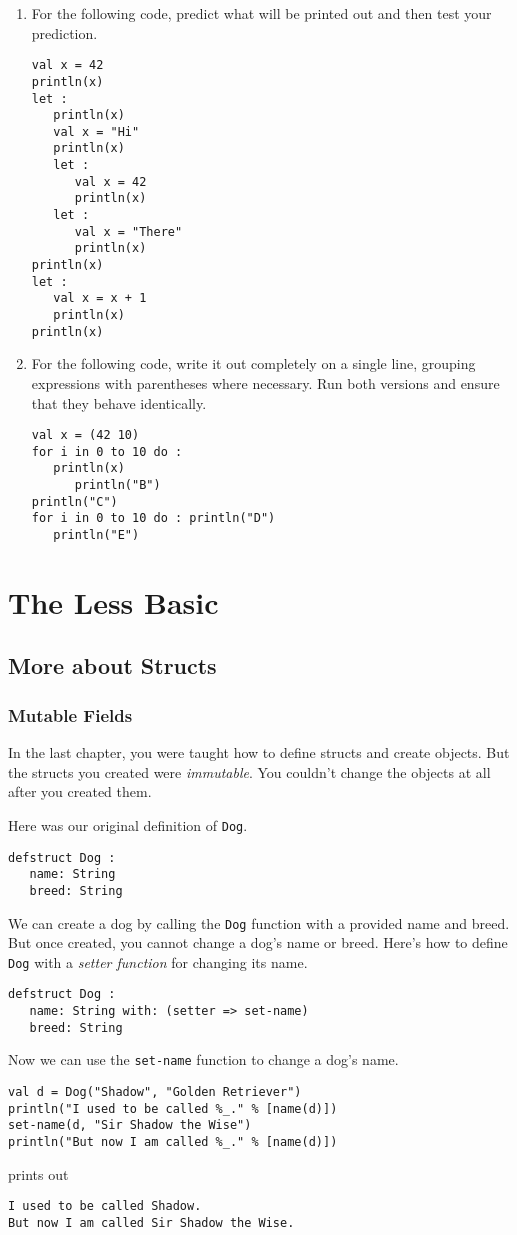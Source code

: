 \documentclass[10pt,oneside]{book}
\begin{document}
\begin{enumerate}
\item For the following code, predict what will be printed out and then test your prediction.
\begin{lstlisting}
val x = 42
println(x)
let :
   println(x)
   val x = "Hi"
   println(x)
   let :
      val x = 42
      println(x)
   let :
      val x = "There"
      println(x)
println(x)
let :
   val x = x + 1
   println(x)
println(x)
\end{lstlisting}

\item For the following code, write it out completely on a single line, grouping expressions with parentheses where necessary. Run both versions and ensure that they behave identically.
\begin{lstlisting}
val x = (42 10)
for i in 0 to 10 do :
   println(x)
      println("B")
println("C")
for i in 0 to 10 do : println("D")
   println("E")
\end{lstlisting}
\end{enumerate}

\chapter{The Less Basic}

\section{More about Structs}
\subsection*{Mutable Fields}
In the last chapter, you were taught how to define structs and create objects. But the structs you created were {\em immutable}. You couldn't change the objects at all after you created them. 

Here was our original definition of \texttt{\frenchspacing Dog}. 
\begin{lstlisting}
defstruct Dog :
   name: String
   breed: String
\end{lstlisting}

We can create a dog by calling the \texttt{\frenchspacing Dog} function with a provided name and breed. But once created, you cannot change a dog's name or breed. Here's how to define \texttt{\frenchspacing Dog} with a {\em setter function} for changing its name.
\begin{lstlisting}
defstruct Dog :
   name: String with: (setter => set-name)
   breed: String
\end{lstlisting}
Now we can use the \texttt{\frenchspacing set-name} function to change a dog's name.
\begin{lstlisting}
val d = Dog("Shadow", "Golden Retriever")
println("I used to be called %_." % [name(d)])
set-name(d, "Sir Shadow the Wise")
println("But now I am called %_." % [name(d)])
\end{lstlisting}
prints out
\begin{lstlisting}
I used to be called Shadow.
But now I am called Sir Shadow the Wise.
\end{lstlisting}
\end{document}
